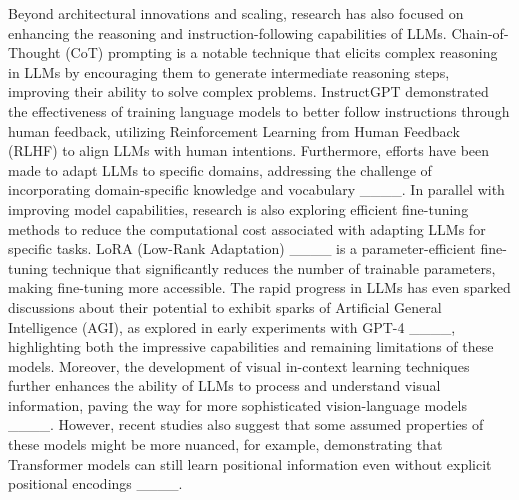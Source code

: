 Beyond architectural innovations and scaling, research has also focused on enhancing the reasoning and instruction-following capabilities of LLMs. Chain-of-Thought (CoT) prompting is a notable technique that elicits complex reasoning in LLMs by encouraging them to generate intermediate reasoning steps, improving their ability to solve complex problems. InstructGPT demonstrated the effectiveness of training language models to better follow instructions through human feedback, utilizing Reinforcement Learning from Human Feedback (RLHF) to align LLMs with human intentions. Furthermore, efforts have been made to adapt LLMs to specific domains, addressing the challenge of incorporating domain-specific knowledge and vocabulary ____. In parallel with improving model capabilities, research is also exploring efficient fine-tuning methods to reduce the computational cost associated with adapting LLMs for specific tasks. LoRA (Low-Rank Adaptation) ____ is a parameter-efficient fine-tuning technique that significantly reduces the number of trainable parameters, making fine-tuning more accessible. The rapid progress in LLMs has even sparked discussions about their potential to exhibit sparks of Artificial General Intelligence (AGI), as explored in early experiments with GPT-4 ____, highlighting both the impressive capabilities and remaining limitations of these models.  Moreover, the development of visual in-context learning techniques further enhances the ability of LLMs to process and understand visual information, paving the way for more sophisticated vision-language models ____. However, recent studies also suggest that some assumed properties of these models might be more nuanced, for example, demonstrating that Transformer models can still learn positional information even without explicit positional encodings ____.